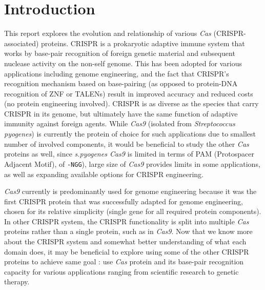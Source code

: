 \documentclass[11pt, oneside]{article}
\begin{document}
\section{Introduction}
This report explores the evolution and relationship of various \textit{Cas} (CRISPR-associated) proteins. CRISPR is a prokaryotic adaptive immune system that works by base-pair recognition of foreign genetic material and subsequent nuclease activity on the non-self genome. This has been adopted for various applications including genome engineering, and the fact that CRISPR's recognition mechanism based on base-pairing (as opposed to protein-DNA recognition of ZNF or TALENs) result in improved accuracy and reduced costs (no protein engineering involved). CRISPR is as diverse as the species that carry CRISPR in its genome, but ultimately have the same function of adaptive immunity against foreign agents. While \textit{Cas9} (isolated from \textit{Streptococcus pyogenes}) is currently the  protein of choice for such applications due to smallest number of involved components, it would be beneficial to study the other \textit{Cas} proteins as well, since \textit{s.pyogenes Cas9} is limited in terms of PAM (Protospacer Adjacent Motif), of \texttt{-NGG}), large size of \textit{Cas9} provides limits in some applications, as well as expanding available options for CRISPR engineering. 

\textit{Cas9} currently is predominantly used for genome engineering because it was the first CRISPR protein that was successfully adapted for genome engineering, chosen for its relative simplicity (single gene for all required protein components). In other CRISPR system, the CRISPR functionality is split into multiple \textit{Cas} proteins rather than a single protein, such as in \textit{Cas9}. Now that we know more about the CRISPR system and somewhat better understanding of what each domain does, it may be beneficial to explore using some of the other CRISPR proteins to achieve same goal : use \textit{Cas} protein and its base-pair recognition capacity for various applications ranging from scientific research to genetic therapy. 
\end{document}
